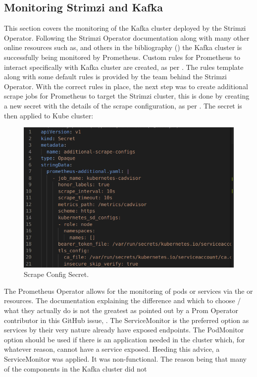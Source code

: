 \subsection{Monitoring Strimzi and Kafka}
This section covers the monitoring of the Kafka cluster deployed by the Strimzi Operator. Following the Strimzi Operator documentation \autocite{DeployingUpgrading28}
along with many other online resources such as\autocite{GrafanaPrometheusSetup}, and others in the bibliography () the Kafka cluster is successfully
being monitored by Prometheus. Custom rules for Prometheus to interact specifically with Kafka cluster are created, as per .
The rules template along with some default rules is provided by the team behind the Strimzi Operator.
\bigbreak
With the correct rules in place, the next step was to create additional scrape jobs for Prometheus to target the Strimzi cluster, this is done by
creating a new secret with the details of the scrape configuration, as per . The secret is then applied to Kube cluster:
\begin{figure}[H]
	\centering
	\includegraphics[width=0.7\linewidth]{figures/additional_scrape_config.png}
	\caption{Scrape Config Secret.}
	\label{fig:prom_scrape_config}
\end{figure}
The Prometheus Operator allows for the monitoring of pods or services via the  or  resources.
The documentation explaining the difference and which to choose / what they actually do is not the greatest as pointed out by a
Prom Operator contributor in this GitHub issue, \autocite{PodMonitorVsServiceMonitor}. The ServiceMonitor is the preferred option as services
by their very nature already have exposed endpoints. The PodMonitor option should be used if there is an application needed in the cluster which,
for whatever reason, cannot have a service exposed.
\bigbreak
Heeding this advice, a ServiceMonitor was applied. It was non-functional. The reason being that many of the components in the Kafka cluster did not
